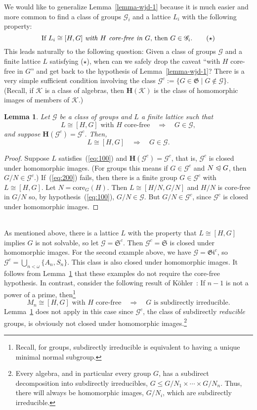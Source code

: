 \documentclass[cm,dissertation,actual,final]{uhthesis}
\theoremstyle{plain}
\newtheorem{lemma}[theorem]{Lemma}
\theoremstyle{definition}
\theoremstyle{remark}
\numberwithin{theorem}{section}
\numberwithin{claim}{chapter}
\numberwithin{equation}{section}
\numberwithin{conjecture}{chapter}
\newcommand{\<}{\ensuremath{\langle}}
\renewcommand{\>}{\ensuremath{\rangle}}
\renewcommand{\leq}{\ensuremath{\leqslant}}
\newcommand{\subnormal}{\ensuremath{\trianglelefteqslant}}
\newcommand{\core}{\ensuremath{\mathrm{core}}}
\newcommand{\0}{\ensuremath{\mathbf{0}}}
\newcommand{\1}{\ensuremath{\mathbf{1}}}
\newcommand{\2}{\ensuremath{\mathbf{2}}}
\newcommand{\3}{\ensuremath{\mathbf{3}}}
\newcommand{\4}{\ensuremath{\mathbf{4}}}
\newcommand{\5}{\ensuremath{\mathbf{5}}}
\newcommand{\sG}{\ensuremath{\mathscr{G}}}
\newcommand{\G}{\ensuremath{\mathfrak{G}}}
\newcommand{\bH}{\ensuremath{\mathbf{H}}}
\newcommand{\sK}{\ensuremath{\mathscr{K}}}
\newcommand{\giant}{\ensuremath{\mathfrak{Gi}}}
\newcommand{\solvable}{\ensuremath{\mathfrak{S}}}
\begin{document}
We would like to generalize Lemma~\ref{lemma-wjd-1} because it is much easier and more
common to find a class of groups ${\sG_i}$ and a lattice $L_i$ with the following
property: 
\[
\text{If $L_i\cong [H,G]$ \emph{with $H$ core-free in $G$}, then $G\in
  {\sG_i}$}. \qquad (\star)
\]
This leads naturally to the following
question: Given a class of groups $\sG$ and a finite lattice $L$ satisfying ($\star$),   
when can we safely drop the caveat ``with $H$ core-free in $G$'' and get back to the
hypothesis of Lemma~\ref{lemma-wjd-1}?
There is a very simple sufficient condition involving
the class $\sG^c := \{ G \in \G \mid G\notin \sG\}$.  (Recall, if 
$\sK$ is a class of algebras, then $\bH(\sK)$ is the class of homomorphic images of members of $\sK$.)
\begin{lemma}
  \label{lemma-wjd-2}
Let $\sG$ be a class of groups and $L$ a finite lattice such that
\begin{equation}
  \label{eq:100}
L \cong [H,G] \text{ with $H$ core-free} \quad \Rightarrow \quad G\in \sG,
\end{equation}
and suppose $\bH(\sG^c) = \sG^c$. Then,  
\begin{equation}
  \label{eq:200}
L \cong [H,G] \quad \Rightarrow \quad G\in \sG.
\end{equation}
\end{lemma}
\begin{proof}
Suppose $L$ satisfies~(\ref{eq:100}) and $\bH(\sG^c) = \sG^c$, that is, $\sG^c$ is closed under homomorphic
images. (For groups this means if $G \in \sG^c$ and $N\subnormal G$, then
$G/N\in \sG^c$.) 
If~(\ref{eq:200}) fails, then there is a
finite group $G\in \sG^c$ with $L\cong [H,G]$.  Let $N = \core_G(H)$.  Then $L \cong
[H/N,G/N]$ and $H/N$ is core-free in $G/N$ so, by hypothesis~(\ref{eq:100}), $G/N \in \sG$.  But
$G/N \in \sG^c$, since $\sG^c$ is closed under homomorphic images.
\end{proof}
~\\[-6pt]
As mentioned above, there is a lattice $L$ with the property that
$L \cong [H, G]$ implies $G$ is not solvable,
so let $\sG = \solvable^c$.  Then $\sG^c = \solvable$ 
is closed under homomorphic images.  
For the second example above, we have $\sG = \giant^c$,
so $\sG^c = \bigcup_{n<\omega}\{A_n, S_n\}$.
This class is also closed under homomorphic images.  It follows from
Lemma~\ref{lemma-wjd-2} that these examples do not require
the core-free hypothesis.   
In contrast, consider the following result of 
%
K\"ohler~\cite{Kohler:1983}: If 
$n-1$ is not a power of a prime, then\footnote{Recall, for groups, subdirectly
  irreducible is equivalent to having a unique minimal normal subgroup.} 
\[
M_n \cong [H, G] \text{ with $H$ core-free} \quad \Rightarrow \quad G \text{ is
  subdirectly irreducible.}
\]
Lemma~\ref{lemma-wjd-2} does not apply in this case since $\sG^c$, the class of
subdirectly \emph{reducible} groups, is obviously not closed under homomorphic 
images.\footnote{Every algebra, and in particular every group $G$, has a subdirect
  decomposition into subdirectly irreducibles, $G\leq G/N_1 \times \cdots\times
  G/N_n$.  Thus, there will always be homomorphic images, $G/N_i$, which are
  subdirectly irreducible.} 
\end{document}
